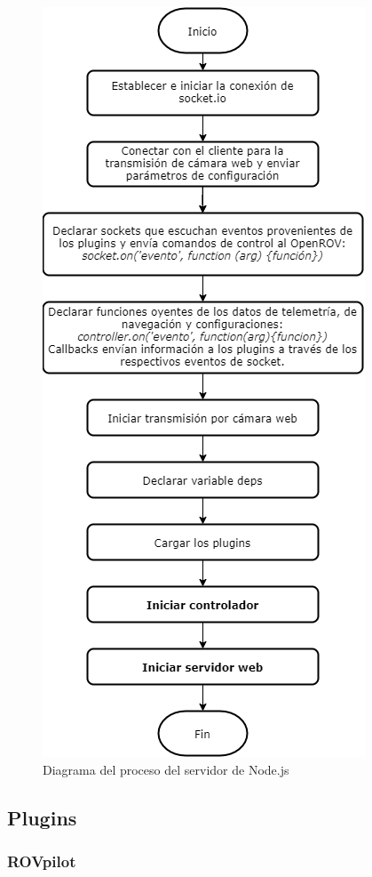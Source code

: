 \begin{figure}[H]
    \centering
    \includegraphics[scale=0.73]{partes/ImgSophia/ApendiceC/DiagramaCockpit.png}
    \caption{Diagrama del proceso del servidor de Node.js}
    \label{fig:DiagCockpit}
\end{figure}

\subsection{Plugins}

\subsubsection{ROVpilot}

